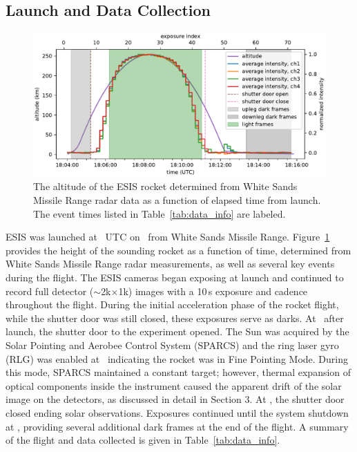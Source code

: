 	\subsection{Launch and Data Collection} 
		\begin{figure}[ht]
			\begin{center}
				\includegraphics{figures/signal_and_altitude_vs_time}
				\caption{The altitude of the ESIS rocket determined from White Sands Missile Range radar data as a function of elapsed time from launch.  The event times listed in Table~\ref{tab:data_info} are labeled.}
				\label{fig:timeline}
			\end{center}
		\end{figure}

		ESIS was launched at \timeMissionStart~UTC
		on \dateMission\ from White Sands Missile Range.  Figure~\ref{fig:timeline} provides the height of the sounding rocket as a function of time, determined from White Sands Missile Range radar measurements, as well as several key events during the flight.  
		The ESIS cameras began exposing at launch and continued to record full detector ($\sim$2k$\times$1k) images with a 10\,s exposure and cadence throughout the flight. During the initial acceleration phase of the rocket flight, while the shutter door was still closed, these exposures serve as darks.  
		At \timeMissionShutterOpen\ after launch, the shutter door to the experiment opened.  
		The Sun was acquired by the Solar Pointing and Aerobee Control System (SPARCS) and the ring laser gyro (RLG) was enabled at \timeMissionRlgEnable\ indicating the rocket was in Fine Pointing Mode.  
		During this mode, SPARCS maintained a constant target; however, thermal expansion of optical components inside the instrument caused the apparent drift of the solar image on the detectors, as discussed in detail in Section 3.  
		At  \timeMissionShutterClose, the shutter door closed ending solar observations. Exposures continued until the system shutdown at \timeDataStop, providing several additional dark frames at the end of the flight.   A summary of the flight and data collected is given in Table~\ref{tab:data_info}.
		
